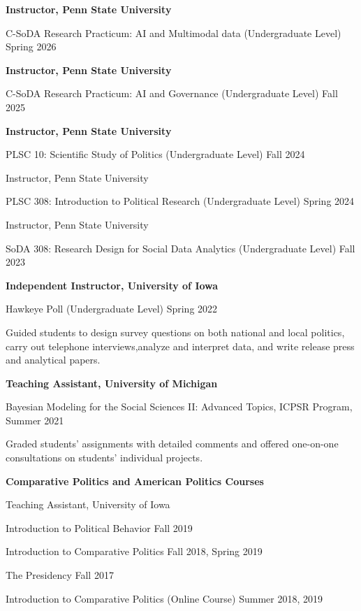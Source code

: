 \documentclass[10.5pt,]{article}
\providecommand{\tightlist}{%
	\setlength{\itemsep}{0pt}\setlength{\parskip}{0pt}}
\renewenvironment{itemize}{
	\begin{list}{}{
			\setlength{\leftmargin}{1.5em}
		}
	}{
	\end{list}
}
\begin{document}
\begin{itemize}
  \begin{itemize}
  \tightlist
  \item
    \textbf{Instructor, Penn State University}
  \item
    C-SoDA Research Practicum: AI and Multimodal data (Undergraduate
    Level) \hfill Spring 2026
  \item
    \textbf{Instructor, Penn State University}
  \item
    C-SoDA Research Practicum: AI and Governance (Undergraduate Level)
    \hfill Fall 2025
  \item
    \textbf{Instructor, Penn State University}
  \item
    PLSC 10: Scientific Study of Politics (Undergraduate Level)
    \hfill Fall 2024
  \item
    Instructor, Penn State University
  \item
    PLSC 308: Introduction to Political Research (Undergraduate Level)
    \hfill Spring 2024
  \item
    Instructor, Penn State University
  \item
    SoDA 308: Research Design for Social Data Analytics (Undergraduate
    Level) \hfill Fall 2023
  \item
    \textbf{Independent Instructor, University of Iowa}
  \item
    Hawkeye Poll (Undergraduate Level) \hfill Spring 2022
  \item
    Guided students to design survey questions on both national and
    local politics, carry out telephone interviews,analyze and interpret
    data, and write release press and analytical papers.
  \item
    \textbf{Teaching Assistant, University of Michigan}
  \item
    Bayesian Modeling for the Social Sciences II: Advanced Topics, ICPSR
    Program, \hfill Summer 2021
  \item
    Graded students' assignments with detailed comments and offered
    one-on-one consultations on students' individual projects.
  \end{itemize}
\item
  \textbf{Comparative Politics and American Politics Courses}

  \begin{itemize}
  \tightlist
  \item
    Teaching Assistant, University of Iowa

    \begin{itemize}
    \tightlist
    \item
      Introduction to Political Behavior \hfill Fall 2019
    \item
      Introduction to Comparative Politics \hfill Fall 2018, Spring 2019
    \item
      The Presidency \hfill Fall 2017
    \item
      Introduction to Comparative Politics (Online Course) \hfill Summer
      2018, 2019
    \end{itemize}
  \end{itemize}
\end{itemize}
\end{document}
